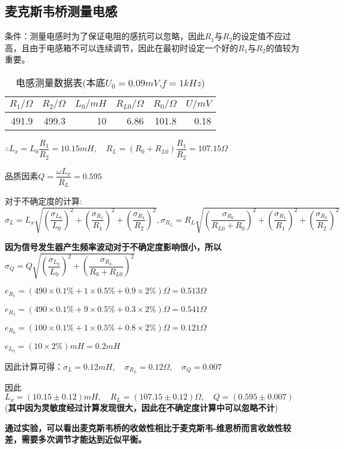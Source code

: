 \documentclass[UTF8]{ctexart}
\begin{document}
	\subsection{麦克斯韦桥测量电感}
	条件：测量电感时为了保证电阻的感抗可以忽略，因此$R_{1}$与$R_{2}$的设定值不应过高，且由于电感箱不可以连续调节，因此在最初时设定一个好的$R_{1}$与$R_{2}$的值较为重要。
	\begin{table}[H]
		\centering
		\caption{电感测量数据表(本底$U_{0}=0.09mV$,$f=1kHz$)}
		\label{电感测量数据表}
		\begin{tabular}{|r|r|r|r|r|r|}
			\toprule[0.5mm]
			$R_{1}/\Omega$&$R_{2}/\Omega$&$L_{0}/mH$&$R_{L0}/\Omega$&$R_{0}/\Omega$&$U/mV$\\
			\midrule
			491.9&499.3&10&6.86&101.8&0.18\\
			\bottomrule[0.5mm]
		\end{tabular}
	\end{table}
	$\therefore L_{x}=L_{0}\dfrac{R_{1}}{R_{2}}=10.15mH,\quad R_{L}=(R_{0}+R_{L0})\dfrac{R_{1}}{R_{2}}=107.15\Omega$
	\par 品质因素$Q=\dfrac{\omega L_{x}}{R_{L}}=0.595$
	\par 对于不确定度的计算:$\sigma_{L}=L_{x}\sqrt{(\dfrac{\sigma_{L_{0}}}{L_{0}})^{2}+(\dfrac{\sigma_{R_{1}}}{R_{1}})^{2}+(\dfrac{\sigma_{R_{2}}}{R_{2}})^{2}},\sigma_{R_{L}}=R_{L}\sqrt{(\dfrac{\sigma_{R_{0}}}{R_{L0}+R_{0}})^{2}+(\dfrac{\sigma_{R_{1}}}{R_{1}})^{2}+(\dfrac{\sigma_{R_{2}}}{R_{2}})^{2}}$
	\par \textbf{因为信号发生器产生频率波动对于不确定度影响很小，所以}$\sigma_{Q}=Q\sqrt{(\dfrac{\sigma_{L_{0}}}{L_{0}})^{2}+(\dfrac{\sigma_{R_{0}}}{R_{0}+R_{L0}})^{2}}$
	\par $e_{R_{1}}=(490\times0.1\%+1\times0.5\%+0.9\times2\%)\Omega=0.513\Omega$
	\par $e_{R_{2}}=(490\times0.1\%+9\times0.5\%+0.3\times2\%)\Omega=0.541\Omega$
	\par $e_{R_{0}}=(100\times0.1\%+1\times0.5\%+0.8\times2\%)\Omega=0.121\Omega$
	\par $e_{L_{0}}=(10\times2\%)mH=0.2mH$
	\par 因此计算可得：$\sigma_{L}=0.12mH,\quad\sigma_{R_{L}}=0.12\Omega,\quad\sigma_{Q}=0.007$
	\par 因此$L_{x}=(10.15\pm 0.12)mH,\quad R_{L}=(107.15\pm 0.12)\Omega,\quad Q=(0.595\pm 0.007)$(\textbf{其中因为灵敏度经过计算发现很大，因此在不确定度计算中可以忽略不计})
	\par \textbf{通过实验，可以看出麦克斯韦桥的收敛性相比于麦克斯韦-维恩桥而言收敛性较差，需要多次调节才能达到近似平衡。}
\end{document}
